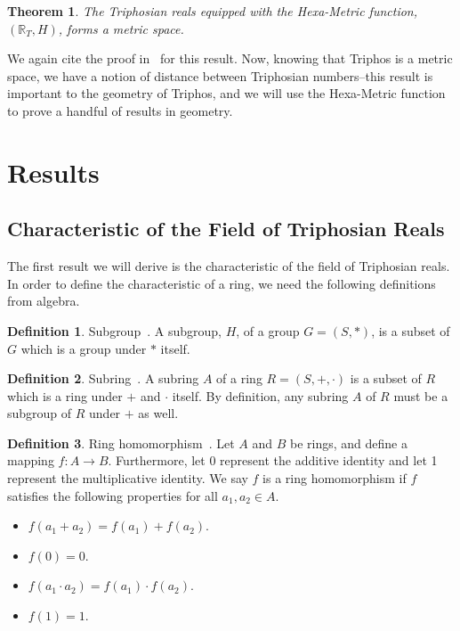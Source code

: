\documentclass[11pt]{article}
\newcommand{\Tri}{\mathbb{R}_T}
\theoremstyle{definition}
\newtheorem{definition}{Definition}
\theoremstyle{plain}
\newtheorem{theorem}{Theorem}
\theoremstyle{remark}
\begin{document}
	\begin{theorem}
		The Triphosian reals equipped with the Hexa-Metric function, \((\Tri,
		H)\), forms a metric space.~\cite{egging}
	\end{theorem}

	We again cite the proof in~\cite{egging} for this result. Now, knowing that
	Triphos is a metric space, we have a notion of distance between Triphosian
	numbers--this result is important to the geometry of Triphos, and we will
	use the Hexa-Metric function to prove a handful of results in geometry.

	\section{Results}

	\subsection{Characteristic of the Field of Triphosian Reals}

	The first result we will derive is the characteristic of the field of
	Triphosian reals. In order to define the characteristic of a ring, we need
	the following definitions from algebra.

	\begin{definition}{Subgroup~\cite{lang}.}
		A subgroup, \(H\), of a group \(G = (S,*)\), is a subset of \(G\) which
		is a group under \(*\) itself.
	\end{definition}

	\begin{definition}{Subring~\cite{lang}.}
		A subring \(A\) of a ring \(R = (S, +, \cdot)\) is a subset of \(R\)
		which is a ring under \(+\) and \(\cdot\) itself. By definition, any
		subring \(A\) of \(R\) must be a subgroup of \(R\) under \(+\) as well.
	\end{definition}

	\begin{definition}{Ring homomorphism~\cite{lang}.}
		Let \(A\) and \(B\) be rings, and define a mapping \(f: A \to B\).
		Furthermore, let 0 represent the additive identity and let 1 represent
		the multiplicative identity. We say \(f\) is a ring homomorphism if
		\(f\) satisfies the following properties for all \(a_1, a_2 \in A\).
		\begin{multicols}{2}
			\begin{itemize}
				\item \(f(a_1 + a_2) = f(a_1) + f(a_2)\).
				\item \(f(0) = 0\).
				\item \(f(a_1 \cdot a_2) = f(a_1)\cdot f(a_2)\).
				\item \(f(1) = 1\).
			\end{itemize}
		\end{multicols}
	\end{definition}
\end{document}
